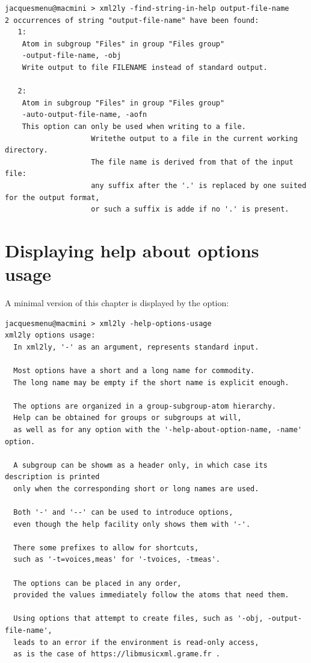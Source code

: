 \begin{lstlisting}[language=Terminal]
jacquesmenu@macmini > xml2ly -find-string-in-help output-file-name
2 occurrences of string "output-file-name" have been found:
   1:
    Atom in subgroup "Files" in group "Files group"
    -output-file-name, -obj
    Write output to file FILENAME instead of standard output.

   2:
    Atom in subgroup "Files" in group "Files group"
    -auto-output-file-name, -aofn
    This option can only be used when writing to a file.
                    Writethe output to a file in the current working directory.
                    The file name is derived from that of the input file:
                    any suffix after the '.' is replaced by one suited for the output format,
                    or such a suffix is adde if no '.' is present.
\end{lstlisting}


\section{Displaying help about options usage}

A minimal version of this chapter is displayed by the  option:
\begin{lstlisting}[language=Terminal]
jacquesmenu@macmini > xml2ly -help-options-usage
xml2ly options usage:
  In xml2ly, '-' as an argument, represents standard input.

  Most options have a short and a long name for commodity.
  The long name may be empty if the short name is explicit enough.

  The options are organized in a group-subgroup-atom hierarchy.
  Help can be obtained for groups or subgroups at will,
  as well as for any option with the '-help-about-option-name, -name' option.

  A subgroup can be showm as a header only, in which case its description is printed
  only when the corresponding short or long names are used.

  Both '-' and '--' can be used to introduce options,
  even though the help facility only shows them with '-'.

  There some prefixes to allow for shortcuts,
  such as '-t=voices,meas' for '-tvoices, -tmeas'.

  The options can be placed in any order,
  provided the values immediately follow the atoms that need them.

  Using options that attempt to create files, such as '-obj, -output-file-name',
  leads to an error if the environment is read-only access,
  as is the case of https://libmusicxml.grame.fr .
\end{lstlisting}


